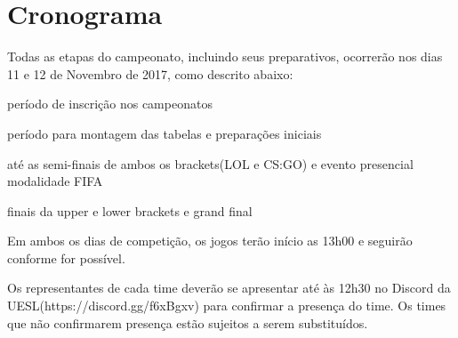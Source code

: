 \section{Cronograma}

Todas as etapas do campeonato, incluindo seus preparativos, ocorrerão nos dias 11 e 12 de Novembro de 2017, como descrito abaixo:

\begin{description}[leftmargin=!,labelwidth=\widthof{\bfseries Até 08/11},labelindent=1.5em]
	\item[Até 08/11] período de inscrição nos campeonatos
	\item[10/11] período para montagem das tabelas e preparações iniciais
	\item[11/11] até as semi-finais de ambos os brackets(LOL e CS:GO) e evento presencial modalidade FIFA
	\item[12/11] finais da upper e lower brackets e grand final
\end{description}

Em ambos os dias de competição, os jogos terão início as 13h00 e seguirão conforme for possível.

Os representantes de cada time deverão se apresentar até às 12h30 no Discord da UESL(https://discord.gg/f6xBgxv) para confirmar a presença do time. Os times que não confirmarem presença estão sujeitos a serem substituídos.